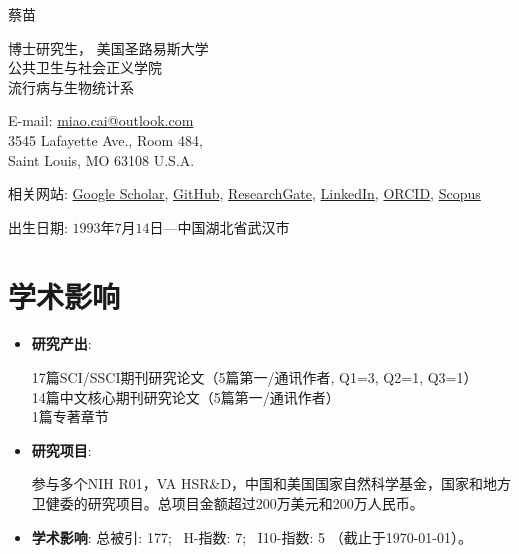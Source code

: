 \documentclass[11pt, a4paper]{article}
\newcommand{\fzxbs}{\CJKfamily{MyCJKfzxbs}}
\begin{document}
	{\LARGE {\fzxbs 蔡苗}}\vspace{0.3cm}
	
	\begin{minipage}[b]{0.65\linewidth}
		博士研究生， 美国圣路易斯大学\\
		公共卫生与社会正义学院\\
		流行病与生物统计系
	\end{minipage}
	\hfill
	\begin{minipage}[b]{0.35\linewidth}
		E-mail: \href{mailto:miao.cai@outlook.com}{miao.cai@outlook.com}\\
		3545 Lafayette Ave., Room 484, \\
		Saint Louis, MO 63108 U.S.A.
	\end{minipage}
	
	相关网站: 
	\href{https://scholar.google.com/citations?user=kjFCzEkAAAAJ&hl=en}{Google Scholar},
	\href{https://github.com/caimiao0714}{GitHub},
	\href{https://www.researchgate.net/profile/Miao_Cai2}{ResearchGate},
	\href{https://www.linkedin.com/in/miao-cai-7b5a62a3/}{LinkedIn},
	\href{https://orcid.org/0000-0003-0170-6905}{ORCID}, 
	\href{https://www.scopus.com/authid/detail.uri?authorId=56824998300}{Scopus}
	
	出生日期: $1993$年$7$月$14$日---中国湖北省武汉市
	
	\section*{学术影响}
	\begin{itemize}[leftmargin=0ex,itemsep=0ex]
		\item \textbf{研究产出}: 
		\begin{minipage}[t]{0.9\linewidth}
			17篇SCI/SSCI期刊研究论文（5篇第一/通讯作者, Q1=3, Q2=1, Q3=1）\\
			14篇中文核心期刊研究论文（5篇第一/通讯作者）\\
			1篇专著章节
		\end{minipage}
		
		\item \textbf{研究项目}: 
		\begin{minipage}[t]{0.9\linewidth}
			参与多个NIH R01，VA HSR\&D，中国和美国国家自然科学基金，国家和地方卫健委的研究项目。总项目金额超过200万美元和200万人民币。
		\end{minipage}

		
		\item \textbf{学术影响}: 总被引: 177; $\,$ H-指数: 7; $\,$ I10-指数: 5 （截止于\today）。
	\end{itemize}
	
\end{document}
